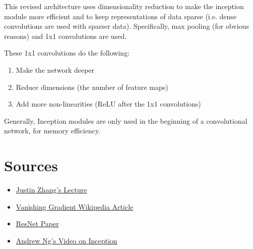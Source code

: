 \documentclass{article}
\begin{document}
    This revised architecture uses dimensionality reduction to make the inception module more efficient and to keep representations of data sparse (i.e. dense convolutions are used with sparser data). Specifically, max pooling (for obvious reasons) and 1x1 convolutions are used.
    
    These 1x1 convolutions do the following:
    \begin{enumerate}
        \item Make the network deeper
        \item Reduce dimensions (the number of feature maps)
        \item Add more non-linearities (ReLU after the 1x1 convolutions)
    \end{enumerate}
    
 Generally, Inception modules are only used in the beginning of a convolutional network, for memory efficiency. 
    
   
\section{Sources}
\begin{itemize}
	\item \href{https://tjmachinelearning.com/lectures/1718/deepconv/deepconv.pdf}{Justin Zhang's Lecture} 
	\item \href{https://en.wikipedia.org/wiki/Vanishing_gradient_problem}{Vanishing Gradient Wikipedia Article}
	\item \href{https://arxiv.org/pdf/1512.03385v1.pdf}{ResNet Paper}
 	\item \href{https://www.coursera.org/lecture/convolutional-neural-networks/inception-network-motivation-5WIZm}{Andrew Ng's Video on Inception}
\end{itemize}
\end{document}
